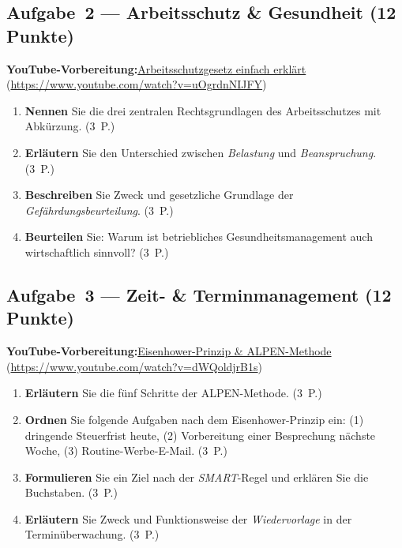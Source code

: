\documentclass[11pt, a4paper]{article}
\begin{document}
\subsection*{Aufgabe~2 --- Arbeitsschutz \& Gesundheit (12 Punkte)}

\noindent\textbf{\color{bfwAccent}YouTube-Vorbereitung:}\enspace \href{https://www.youtube.com/watch?v=uOgrdnNIJFY}{Arbeitsschutzgesetz einfach erklärt} (\url{https://www.youtube.com/watch?v=uOgrdnNIJFY})

\medskip
\begin{enumerate}[label=(\alph*)]
  \item \textbf{Nennen} Sie die drei zentralen Rechtsgrundlagen des Arbeitsschutzes mit Abkürzung. \hfill (3~P.)
  \item \textbf{Erläutern} Sie den Unterschied zwischen \emph{Belastung} und \emph{Beanspruchung}. \hfill (3~P.)
  \item \textbf{Beschreiben} Sie Zweck und gesetzliche Grundlage der \emph{Gefährdungsbeurteilung}. \hfill (3~P.)
  \item \textbf{Beurteilen} Sie: Warum ist betriebliches Gesundheitsmanagement auch wirtschaftlich sinnvoll? \hfill (3~P.)
\end{enumerate}

\subsection*{Aufgabe~3 --- Zeit- \& Terminmanagement (12 Punkte)}

\noindent\textbf{\color{bfwAccent}YouTube-Vorbereitung:}\enspace \href{https://www.youtube.com/watch?v=dWQoldjrB1s}{Eisenhower-Prinzip \& ALPEN-Methode} (\url{https://www.youtube.com/watch?v=dWQoldjrB1s})

\medskip
\begin{enumerate}[label=(\alph*)]
  \item \textbf{Erläutern} Sie die fünf Schritte der ALPEN-Methode. \hfill (3~P.)
  \item \textbf{Ordnen} Sie folgende Aufgaben nach dem Eisenhower-Prinzip ein: (1) dringende Steuerfrist heute, (2) Vorbereitung einer Besprechung nächste Woche, (3) Routine-Werbe-E-Mail. \hfill (3~P.)
  \item \textbf{Formulieren} Sie ein Ziel nach der \emph{SMART}-Regel und erklären Sie die Buchstaben. \hfill (3~P.)
  \item \textbf{Erläutern} Sie Zweck und Funktionsweise der \emph{Wiedervorlage} in der Terminüberwachung. \hfill (3~P.)
\end{enumerate}
\end{document}
